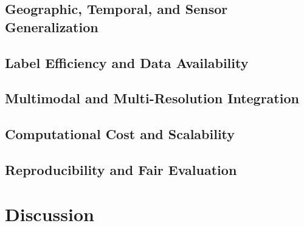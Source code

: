 \documentclass[
    11pt,
    a4paper,
    parskip=half,
    bibliography=totoc,
    numbers=noenddot
]{scrartcl}
\begin{document}
\subsection{Geographic, Temporal, and Sensor Generalization}


\subsection{Label Efficiency and Data Availability}


\subsection{Multimodal and Multi-Resolution Integration}


\subsection{Computational Cost and Scalability}


\subsection{Reproducibility and Fair Evaluation}


\section{Discussion}
\end{document}
